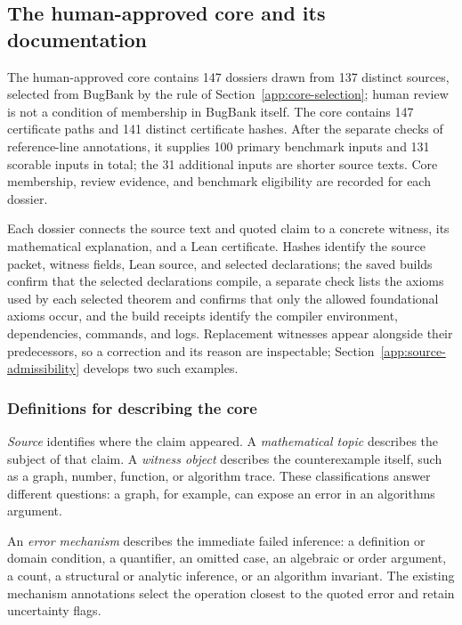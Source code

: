 \subsection{The human-approved core and its documentation}
\label{app:verified-census}
\label{app:retained-core-membership}

The human-approved core contains 147 dossiers drawn from 137 distinct sources, selected from BugBank by the rule of Section~\ref{app:core-selection}; human review is not a condition of membership in BugBank itself. The core contains 147 certificate paths and 141 distinct certificate hashes. After the separate checks of reference-line annotations, it supplies 100 primary benchmark inputs and 131 scorable inputs in total; the 31 additional inputs are shorter source texts. Core membership, review evidence, and benchmark eligibility are recorded for each dossier.

Each dossier connects the source text and quoted claim to a concrete witness, its mathematical explanation, and a Lean certificate. Hashes identify the source packet, witness fields, Lean source, and selected declarations; the saved builds confirm that the selected declarations compile, a separate check lists the axioms used by each selected theorem and confirms that only the allowed foundational axioms occur, and the build receipts identify the compiler environment, dependencies, commands, and logs. Replacement witnesses appear alongside their predecessors, so a correction and its reason are inspectable; Section~\ref{app:source-admissibility} develops two such examples.

\subsubsection{Definitions for describing the core}
\label{app:structure-census}

\emph{Source} identifies where the claim appeared. A \emph{mathematical topic} describes the subject of that claim. A \emph{witness object} describes the counterexample itself, such as a graph, number, function, or algorithm trace. These classifications answer different questions: a graph, for example, can expose an error in an algorithms argument.

An \emph{error mechanism} describes the immediate failed inference: a definition or domain condition, a quantifier, an omitted case, an algebraic or order argument, a count, a structural or analytic inference, or an algorithm invariant. The existing mechanism annotations select the operation closest to the quoted error and retain uncertainty flags.

